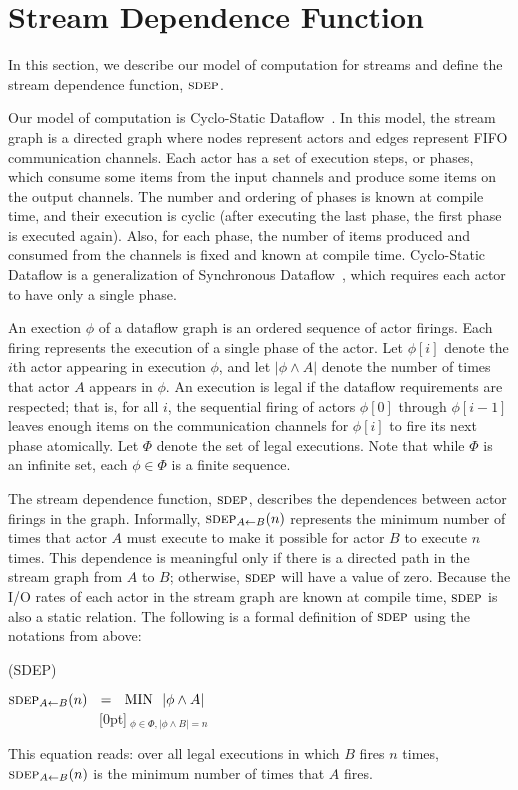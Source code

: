 \section{Stream Dependence Function}

In this section, we describe our model of computation for streams and
define the stream dependence function, $\textsc{sdep}$.

Our model of computation is Cyclo-Static Dataflow~\cite{BELP96}.  In
this model, the stream graph is a directed graph where nodes represent
actors and edges represent FIFO communication channels.  Each actor
has a set of execution steps, or phases, which consume some items from
the input channels and produce some items on the output channels.  The
number and ordering of phases is known at compile time, and their
execution is cyclic (after executing the last phase, the first phase
is executed again).  Also, for each phase, the number of items
produced and consumed from the channels is fixed and known at compile
time.  Cyclo-Static Dataflow is a generalization of Synchronous
Dataflow~\cite{LM87-i}, which requires each actor to have only a
single phase.

An exection $\phi$ of a dataflow graph is an ordered sequence of actor
firings.  Each firing represents the execution of a single phase of
the actor.  Let $\phi[i]$ denote the $i$th actor appearing in
execution $\phi$, and let $|\phi \wedge A|$ denote the number of times
that actor $A$ appears in $\phi$.  An execution is legal if the
dataflow requirements are respected; that is, for all $i$, the
sequential firing of actors $\phi[0]$ through $\phi[i-1]$ leaves
enough items on the communication channels for $\phi[i]$ to fire its
next phase atomically.  Let $\Phi$ denote the set of legal executions.
Note that while $\Phi$ is an infinite set, each $\phi \in \Phi$ is a
finite sequence.

The stream dependence function, $\textsc{sdep}$, describes the dependences
between actor firings in the graph.  Informally, $\sdepf{A}{B}(n)$
represents the minimum number of times that actor $A$ must execute to
make it possible for actor $B$ to execute $n$ times.  This dependence
is meaningful only if there is a directed path in the stream graph
from $A$ to $B$; otherwise, $\textsc{sdep}$ will have a value of zero.
Because the I/O rates of each actor in the stream graph are known at
compile time, $\textsc{sdep}$ is also a static relation.  The following is a
formal definition of $\textsc{sdep}$ using the notations from above:
\begin{definition}(SDEP)
\begin{center}
$\sdepf{A}{B}(n)~~ = ~~\mbox{MIN}~~|\phi \wedge A|$ \\
~~~~~~~~~~~~~\raisebox{5pt}[0pt]{$~_{\phi \in \Phi, |\phi \wedge B| = n}$}
\end{center}
\end{definition}
This equation reads: over all legal executions in which $B$ fires $n$
times, $\sdepf{A}{B}(n)$ is the minimum number of times that $A$ fires.

